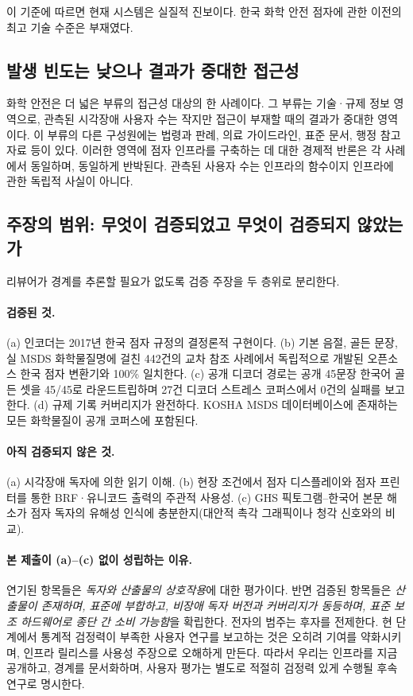 \documentclass[journal]{IEEEtran}
\begin{document}
이 기준에 따르면 현재 시스템은 실질적 진보이다. 한국 화학 안전 점자에 관한 이전의 최고 기술 수준은 부재였다.

\subsection{발생 빈도는 낮으나 결과가 중대한 접근성}

화학 안전은 더 넓은 부류의 접근성 대상의 한 사례이다. 그 부류는 기술·규제 정보 영역으로, 관측된 시각장애 사용자 수는 작지만 접근이 부재할 때의 결과가 중대한 영역이다. 이 부류의 다른 구성원에는 법령과 판례, 의료 가이드라인, 표준 문서, 행정 참고 자료 등이 있다. 이러한 영역에 점자 인프라를 구축하는 데 대한 경제적 반론은 각 사례에서 동일하며, 동일하게 반박된다. 관측된 사용자 수는 인프라의 함수이지 인프라에 관한 독립적 사실이 아니다.

\subsection{주장의 범위: 무엇이 검증되었고 무엇이 검증되지 않았는가}
\label{sec:scope-of-claims}

리뷰어가 경계를 추론할 필요가 없도록 검증 주장을 두 층위로 분리한다.

\paragraph{검증된 것.}
(a) 인코더는 2017년 한국 점자 규정의 결정론적 구현이다. (b) 기본 음절, 골든 문장, 실 MSDS 화학물질명에 걸친 442건의 교차 참조 사례에서 독립적으로 개발된 오픈소스 한국 점자 변환기와 100\% 일치한다. (c) 공개 디코더 경로는 공개 45문장 한국어 골든 셋을 45/45로 라운드트립하며 27건 디코더 스트레스 코퍼스에서 0건의 실패를 보고한다. (d) 규제 기록 커버리지가 완전하다. KOSHA MSDS 데이터베이스에 존재하는 모든 화학물질이 공개 코퍼스에 포함된다.

\paragraph{아직 검증되지 않은 것.}
(a) 시각장애 독자에 의한 읽기 이해. (b) 현장 조건에서 점자 디스플레이와 점자 프린터를 통한 BRF·유니코드 출력의 주관적 사용성. (c) GHS 픽토그램--한국어 본문 해소가 점자 독자의 유해성 인식에 충분한지(대안적 촉각 그래픽이나 청각 신호와의 비교).

\paragraph{본 제출이 (a)--(c) 없이 성립하는 이유.}
연기된 항목들은 \emph{독자와 산출물의 상호작용}에 대한 평가이다. 반면 검증된 항목들은 \emph{산출물이 존재하며, 표준에 부합하고, 비장애 독자 버전과 커버리지가 동등하며, 표준 보조 하드웨어로 종단 간 소비 가능함}을 확립한다. 전자의 범주는 후자를 전제한다. 현 단계에서 통계적 검정력이 부족한 사용자 연구를 보고하는 것은 오히려 기여를 약화시키며, 인프라 릴리스를 사용성 주장으로 오해하게 만든다. 따라서 우리는 인프라를 지금 공개하고, 경계를 문서화하며, 사용자 평가는 별도로 적절히 검정력 있게 수행될 후속 연구로 명시한다.
\end{document}

